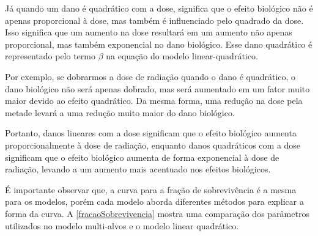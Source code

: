 \documentclass[11pt,a4paper]{article}
\newcounter{exemplo}
\begin{document}
	Já quando um dano é quadrático com a dose, significa que o efeito biológico não é apenas proporcional à dose, mas também é influenciado pelo quadrado da dose. Isso significa que um aumento na dose resultará em um aumento não apenas proporcional, mas também exponencial no dano biológico. Esse dano quadrático é representado pelo termo $\beta$ na equação do modelo linear-quadrático.

	Por exemplo, se dobrarmos a dose de radiação quando o dano é quadrático, o dano biológico não será apenas dobrado, mas será aumentado em um fator muito maior devido ao efeito quadrático. Da mesma forma, uma redução na dose pela metade levará a uma redução muito maior do dano biológico.

	Portanto, danos lineares com a dose significam que o efeito biológico aumenta proporcionalmente à dose de radiação, enquanto danos quadráticos com a dose significam que o efeito biológico aumenta de forma exponencial à dose de radiação, levando a um aumento mais acentuado nos efeitos biológicos.



	É importante observar que, a curva para a fração de sobrevivência é a mesma para os modelos, porém cada modelo aborda diferentes métodos para explicar a forma da curva. A \ref{fracaoSobrevivencia} mostra uma comparação dos parâmetros utilizados no modelo multi-alvos e o modelo linear quadrático.
\end{document}
